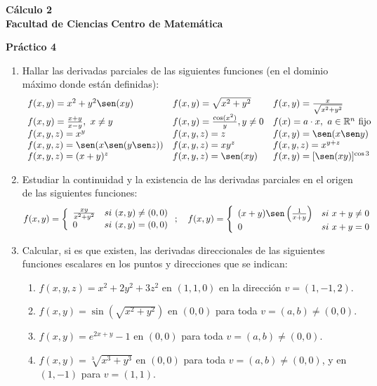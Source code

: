 \documentclass[11pt]{article}
\newcommand{\R}{\mathbb{R}}
\begin{document}
 \hfill {\bf C\'{a}lculo 2} \\
{\bf Facultad de Ciencias} 
{\bf Centro de Matem\'{a}tica} 

\vspace{1cm}

\begin{center}
{\bf Pr\'{a}ctico 4 }
\end{center}

\vspace{0,1cm}

\begin{enumerate}

 \item Hallar las derivadas parciales de las siguientes funciones (en el dominio m\'aximo donde est\'an definidas):
   \[\begin{array}{llll}
    f(x,y)=x^2+y^2\sen(xy)&f(x,y)=\sqrt{x^2+y^2}
                                   &f(x,y)=\frac{x}{\sqrt{x^2+y^2}}\\   
    f(x,y)=\frac{x+y}{x-y},\ x\neq y&f(x,y)=\frac{\cos(x^2)}{y},
                           y\neq 0&f(x)=a\cdot x,\ a\in\R^n\textrm{
                             fijo} \\ 
    f(x,y,z)=x^y    &f(x,y,z)=z   &f(x,y)=\sen(x\sen y)\\ 
    f(x,y,z)=\sen(x\sen(y\sen z))&f(x,y,z)=x{y^z}&f(x,y,z)=x^{y+z}\\
    f(x,y,z)=(x+y)^z    &f(x,y,z)=\sen(xy)&f(x,y)=[\sen(xy)]^{\cos
      3}\\ 
    \end{array}\]
    
\item Estudiar la continuidad y la existencia de las derivadas
  parciales en el origen de las siguientes funciones:
\[ f(x,y)= \left\{ \begin{array}{ll}
 \frac{xy}{x^2+y^2} & si\ (x,y)\neq (0,0)\\ 
 0 & si\ (x,y)=(0,0) \end{array} \right.;\quad
 f(x,y)= \left\{ \begin{array}{ll}
 (x+y)\sen\left(\frac{1}{x+y}\right) & si\ x+y\neq 0\\ 
 0 & si\ x+y=0 \end{array} \right. \]
 
\item Calcular, si es que existen, las derivadas direccionales de las siguientes funciones
  escalares en los puntos y direcciones que se indican:\begin{enumerate}
 \item $f(x,y,z)=x^2+2y^2+3z^2$ en $(1,1,0)$ en la direcci\'on $v=(1,-1,2)$.
 \item $f(x,y)=\sin \left( \sqrt{x^{2}+y^{2}}\right) $ en $(0,0)$ para toda $v=(a,b)\neq(0,0)$.
 \item  $f(x,y)=e^{2x+y}-1$ en $(0,0)$ para toda $v=(a,b)\neq(0,0)$.
\item $f(x,y)=\sqrt[3]{x^{3}+y^{3}}$ en $(0,0)$ para toda $v=(a,b)\neq(0,0)$, y en $(1,-1)$ para $v=(1,1)$. 


\end{enumerate}
\end{enumerate}
\end{document}
